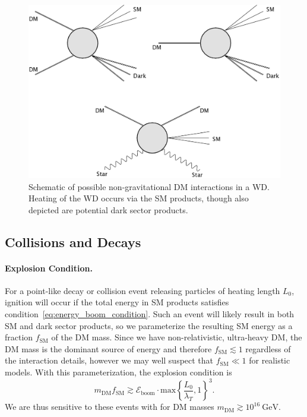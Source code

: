 \documentclass[twocolumn,preprintnumbers,amsmath,amssymb,prd, superscriptaddress]{revtex4} %
\newcommand{\Eboom}{\mathcal{E}_\text{boom}}
\newcommand{\GeV}{\text{GeV}}
\begin{document}
\begin{figure}
\includegraphics[scale=0.09]{feynmandiag.jpg}
\caption{Schematic of possible non-gravitational DM interactions in a WD. Heating of the WD occurs via the SM products, though also depicted are potential dark sector products.}
\label{fig:feynman}
\end{figure}

\subsection{Collisions and Decays}

\paragraph{Explosion Condition.}
For a point-like decay or collision event releasing particles of heating length $L_0$, ignition will occur if the total energy in SM products satisfies condition~\eqref{eq:energy_boom_condition}.
Such an event will likely result in both SM and dark sector products, so we parameterize the resulting SM energy as a fraction $f_\text{SM}$ of the DM mass.
Since we have non-relativistic, ultra-heavy DM, the DM mass is the dominant source of energy and therefore $f_\text{SM} \lesssim 1$ regardless of the interaction details, however we may well suspect that $f_\text{SM} \ll 1$ for realistic models.
With this parameterization, the explosion condition is
\begin{equation}
\label{eq:coldecay}
  m_\text{DM} f_\text{SM}  \gtrsim \Eboom \cdot \text{max} \left \{\frac{L_0}{\lambda_T}, 1 \right \}^3.
\end{equation}
We are thus sensitive to these events with for DM masses $m_\text{DM} \gtrsim 10^{16} ~\GeV$.
\end{document}
